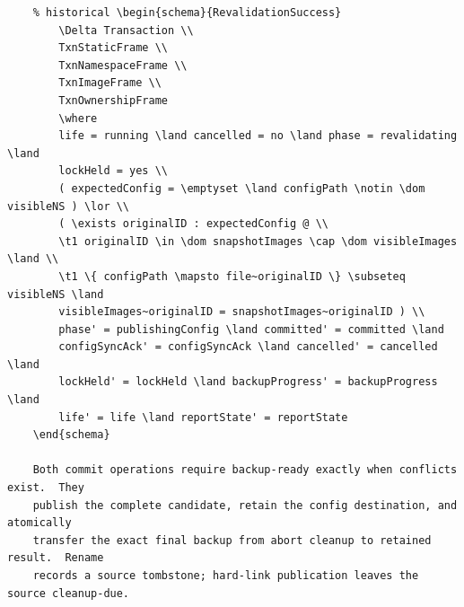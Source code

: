 \documentclass{article}
\begin{document}
\begin{verbatim}
	% historical \begin{schema}{RevalidationSuccess}
		\Delta Transaction \\
		TxnStaticFrame \\
		TxnNamespaceFrame \\
		TxnImageFrame \\
		TxnOwnershipFrame
		\where
		life = running \land cancelled = no \land phase = revalidating \land
		lockHeld = yes \\
		( expectedConfig = \emptyset \land configPath \notin \dom visibleNS ) \lor \\
		( \exists originalID : expectedConfig @ \\
		\t1 originalID \in \dom snapshotImages \cap \dom visibleImages \land \\
		\t1 \{ configPath \mapsto file~originalID \} \subseteq visibleNS \land
		visibleImages~originalID = snapshotImages~originalID ) \\
		phase' = publishingConfig \land committed' = committed \land
		configSyncAck' = configSyncAck \land cancelled' = cancelled \land
		lockHeld' = lockHeld \land backupProgress' = backupProgress \land
		life' = life \land reportState' = reportState
	\end{schema}

	Both commit operations require backup-ready exactly when conflicts exist.  They
	publish the complete candidate, retain the config destination, and atomically
	transfer the exact final backup from abort cleanup to retained result.  Rename
	records a source tombstone; hard-link publication leaves the source cleanup-due.


\end{verbatim}
\end{document}
